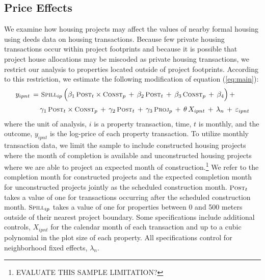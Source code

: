 \documentclass[12pt]{article}
\begin{document}
\subsection{Price Effects}\label{section:resultsprices}


We examine how housing projects may affect the values of nearby formal housing using deeds data on housing transactions.  Because few private housing transactions occur within project footprints and because it is possible that project house allocations may be miscoded as private housing transactions, we restrict our analysis to properties located outside of project footprints.  According to this restriction, we estimate the following modification of equation (\ref{eq:main}):
\begin{align}\label{eq:mainprice}
\begin{split}
\quad y_{ipnt} \, =& \,\, \textsc{\small Spill}_{ip} \, \Big( \beta_1 \, \textsc{\small Post}_{t}\times\textsc{\small Const}_{p} \, + \, \beta_2 \, \textsc{\small Post}_{t} \, + \, \beta_3 \, \textsc{\small Const}_{p} \, +\, \beta_4 \Big) \, + \\[.2em]
& \, \gamma_1 \,  \textsc{\small Post}_{t}\times\textsc{\small Const}_{p} \, + \, \gamma_2 \,\textsc{\small Post}_{t} \, + \, \gamma_3 \,  \textsc{\small Proj}_{p} \, + \, \theta \, X_{ipnt} \, + \, \lambda_n \, + \, \varepsilon_{ipnt} \quad 
\end{split}
\end{align}
\noindent where the unit of analysis, $i$ is a property transaction, time, $t$ is monthly, and the outcome, $y_{ipnt}$ is the log-price of each property transaction.  To utilize monthly transaction data, we limit the sample to include constructed housing projects where the month of completion is available and unconstructed housing projects where we are able to project an expected month of construction.\footnote{EVALUATE THIS SAMPLE LIMITATION?}  We refer to the completion month for constructed projects and the expected completion month for unconstructed projects jointly as the scheduled construction month.  $\textsc{\small Post}_{t}$ takes a value of one for transactions occurring after the scheduled construction month.  $\textsc{\small Spill}_{ip}$ takes a value of one for properties between 0 and 500 meters outside of their nearest project boundary.  Some specifications include additional controls, $X_{ipnt}$  for the calendar month of each transaction and up to a cubic polynomial in the plot size of each property.  All specifications control for neighborhood fixed effects, $\lambda_n$.  
\end{document}
